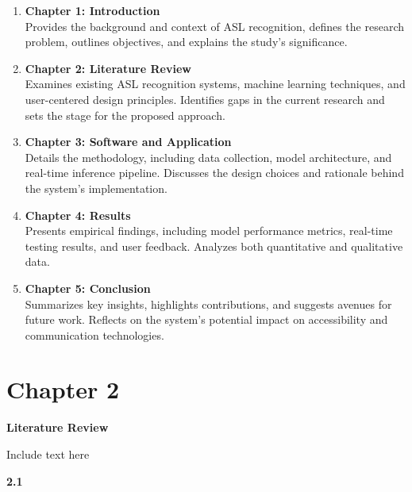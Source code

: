 \documentclass[12pt]{article}
\begin{document}
\begin{enumerate}
  \item \textbf{Chapter 1: Introduction}\\
  Provides the background and context of ASL recognition, defines the research problem, outlines objectives, and explains the study’s significance.

  \item \textbf{Chapter 2: Literature Review}\\
  Examines existing ASL recognition systems, machine learning techniques, and user-centered design principles. Identifies gaps in the current research and sets the stage for the proposed approach.

  \item \textbf{Chapter 3: Software and Application}\\
  Details the methodology, including data collection, model architecture, and real-time inference pipeline. Discusses the design choices and rationale behind the system’s implementation.

  \item \textbf{Chapter 4: Results}\\
  Presents empirical findings, including model performance metrics, real-time testing results, and user feedback. Analyzes both quantitative and qualitative data.

  \item \textbf{Chapter 5: Conclusion}\\
  Summarizes key insights, highlights contributions, and suggests avenues for future work. Reflects on the system’s potential impact on accessibility and communication technologies.
\end{enumerate}

\newpage
\section*{Chapter 2}
\begin{center}
\large \textbf{Literature Review}
\end{center}

Include text here

\vspace{1.5em}
\noindent
\textbf{2.1 }
\vspace{1.5em}
\end{document}
